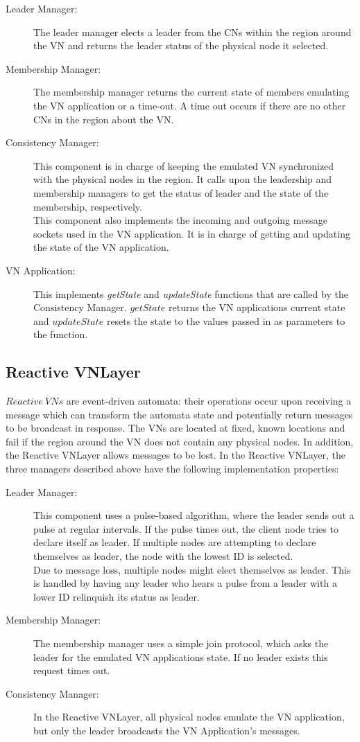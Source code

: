\documentclass[12pt]{article}
\begin{document}
\begin{description}
\item[Leader Manager:] The leader manager elects a leader from the CNs within the region around the VN and returns the leader status of the physical node it selected.
\item[Membership Manager:] The membership manager returns the current state of members emulating the VN application or a time-out.  A time out occurs if there are no other CNs in the region about the VN.
\item[Consistency Manager:] This component is in charge of keeping the emulated VN synchronized with the physical nodes in the region. It calls upon the leadership and membership managers to get the status of leader and the state of the membership, respectively.\\ %
This component also implements the incoming and outgoing message sockets used in the VN application. It is in charge of getting and updating the state of the VN application.  

\item[VN Application:] This implements {\em getState} and {\em updateState} functions that are called by the Consistency Manager.  $getState$ returns the VN applications current state and $updateState$ resets the state to the values passed in as parameters to the function.  
\end{description}

\subsection{Reactive VNLayer}
$Reactive\ VNs$ are event-driven automata: their operations occur upon receiving a message which can transform the automata state and potentially return messages to be broadcast in response.  The VNs are located at fixed, known locations and fail if the region around the VN does not contain any physical nodes.  In addition, the Reactive VNLayer allows messages to be lost.  
In the Reactive VNLayer, the three managers described above have the following implementation properties: 
\begin{description}
\item[Leader Manager:] This component uses a pulse-based algorithm, where the leader sends out a pulse at regular intervals.  If the pulse times out, the client node tries to declare itself as leader.  If multiple nodes are attempting to declare themselves as leader, the node with the lowest ID is selected.  \\
Due to message loss, multiple nodes might elect themselves as leader. This is handled by having any leader who hears a pulse from a  leader with a lower ID relinquish its status as leader.  
\item[Membership Manager:] The membership manager uses a simple join protocol, which asks the leader for the emulated VN applications state.  If no leader exists this request times out. 
\item[Consistency Manager:]In the Reactive VNLayer, all physical nodes emulate the VN application, but only the leader broadcasts the VN Application's messages.  
\end{description}
\end{document}
